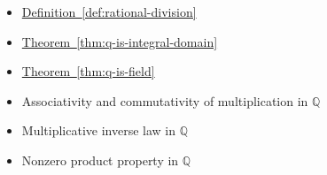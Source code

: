 \begin{dependencies}
\begin{itemize}
  \item \hyperref[def:rational-division]{Definition~\ref*{def:rational-division}}
  \item \hyperref[thm:q-is-integral-domain]{Theorem~\ref*{thm:q-is-integral-domain}}
  \item \hyperref[thm:q-is-field]{Theorem~\ref*{thm:q-is-field}}
  \item Associativity and commutativity of multiplication in $\mathbb{Q}$
  \item Multiplicative inverse law in $\mathbb{Q}$
  \item Nonzero product property in $\mathbb{Q}$
\end{itemize}
\end{dependencies}
